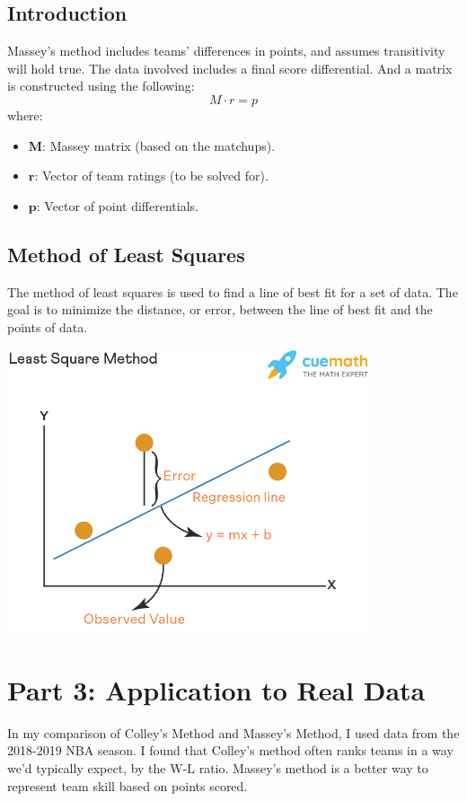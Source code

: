 \documentclass[12pt]{article}
\begin{document}
\subsection{Introduction}
Massey's method includes teams' differences in points, and assumes transitivity 
will hold true. The data involved includes a final score differential. And 
a matrix is constructed using the following: 
\newpage
\[
M \cdot r = p
\]
where:
\begin{itemize}
    \item \(\mathbf{M}\): Massey matrix (based on the matchups).
    \item \(\mathbf{r}\): Vector of team ratings (to be solved for).
    \item \(\mathbf{p}\): Vector of point differentials.
\end{itemize}


\subsection{Method of Least Squares}
The method of least squares is used to find a line of best fit for a set of data. 
The goal is to minimize the distance, or error, between the line of best fit 
and the points of data.

\begin{center}
    \includegraphics[width=0.8\textwidth]{least-square-method-1-1650276785.png}
    \end{center}


\section{Part 3: Application to Real Data}
In my comparison of Colley's Method and Massey's Method, I used data from the 
2018-2019 NBA season. I found that Colley's method often ranks teams
in a way we'd typically expect, by the W-L ratio. Massey's method is a better 
way to represent team skill based on points scored.
\end{document}
